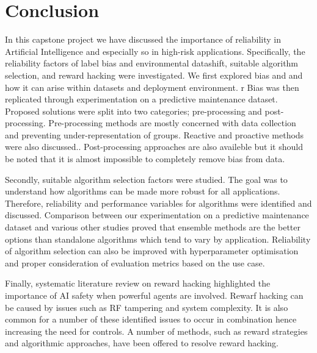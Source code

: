 \chapter{Conclusion}
In this capstone project we have discussed the importance of reliability in Artificial Intelligence 
and especially so in high-risk applications.
Specifically, the reliability factors of label bias and environmental datashift, suitable algorithm selection,
and reward hacking were investigated.
We first explored bias and and how it can arise within datasets and deployment environment. r
Bias was then replicated through experimentation on a predictive maintenance dataset. 
Proposed solutions were split into two categories; pre-processing and post-processing.
Pre-processing methods are mostly concerned with data collection and preventing under-representation of groups.
Reactive and proactive methods were also discussed..
Post-processing approaches are also availeble but it should be noted that it is almost impossible to completely remove 
bias from data.

Secondly, suitable algorithm selection factors were studied. The goal was to understand how algorithms can be made more
robust for all applications. Therefore, reliability and performance variables for algorithms were identified and discussed.
Comparison between our experimentation on a predictive maintenance dataset and various other studies proved that ensemble methods 
are the better options than standalone algorithms which tend to vary by application. 
Reliability of algorithm selection can also be improved with hyperparameter optimisation and proper consideration of 
evaluation metrics based on the use case.

Finally, systematic literature review on reward hacking highlighted the importance of AI safety when powerful agents
are involved. Rewarf hacking can be caused by issues such as RF tampering and system complexity. 
It is also common for a number of these identified issues to occur in combination hence increasing the need for controls.
A number of methods, such as reward strategies and algorithmic approaches, have been offered to resolve reward hacking.